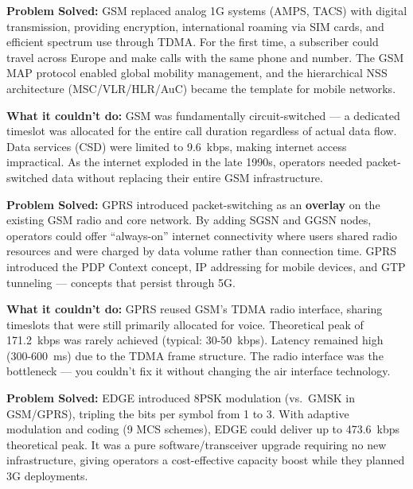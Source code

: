 

\CNchained{}

\textbf{Problem Solved:} GSM replaced analog 1G systems (AMPS, TACS) with digital transmission, providing encryption, international roaming via SIM cards, and efficient spectrum use through TDMA. For the first time, a subscriber could travel across Europe and make calls with the same phone and number. The GSM MAP protocol enabled global mobility management, and the hierarchical NSS architecture (MSC/\allowbreak{}VLR/\allowbreak{}HLR/\allowbreak{}AuC) became the template for mobile networks.

\textbf{What it couldn’t do:} GSM was fundamentally circuit-switched — a dedicated timeslot was allocated for the entire call duration regardless of actual data flow. Data services (CSD) were limited to 9.6~kbps, making internet access impractical. As the internet exploded in the late 1990s, operators needed packet-switched data without replacing their entire GSM infrastructure.


\textbf{Problem Solved:} GPRS introduced packet-switching as an \textbf{overlay} on the existing GSM radio and core network. By adding SGSN and GGSN nodes, operators could offer ``always-on'' internet connectivity where users shared radio resources and were charged by data volume rather than connection time. GPRS introduced the PDP Context concept, IP addressing for mobile devices, and GTP tunneling — concepts that persist through 5G.

\textbf{What it couldn’t do:} GPRS reused GSM’s TDMA radio interface, sharing timeslots that were still primarily allocated for voice. Theoretical peak of 171.2~kbps was rarely achieved (typical: 30-50~kbps). Latency remained high (300-600~ms) due to the TDMA frame structure. The radio interface was the bottleneck — you couldn’t fix it without changing the air interface technology.


\textbf{Problem Solved:} EDGE introduced 8PSK modulation (vs. GMSK in GSM/\allowbreak{}GPRS), tripling the bits per symbol from 1 to 3. With adaptive modulation and coding (9 MCS schemes), EDGE could deliver up to 473.6~kbps theoretical peak. It was a pure software/\allowbreak{}transceiver upgrade requiring no new infrastructure, giving operators a cost-effective capacity boost while they planned 3G deployments.

